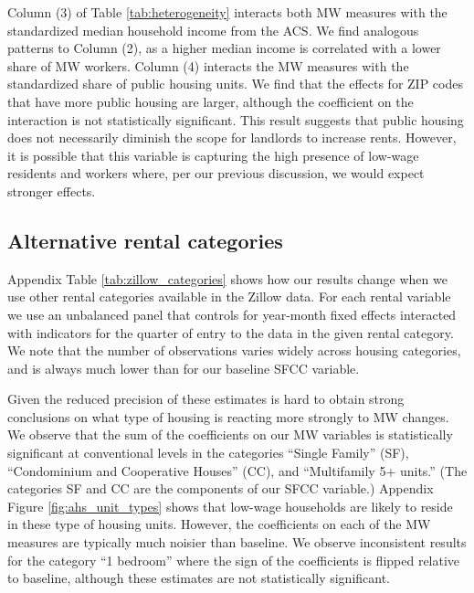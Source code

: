 Column (3) of Table \ref{tab:heterogeneity} interacts both MW measures with the
standardized median household income from the ACS.
We find analogous patterns to Column (2), as a higher median income is 
correlated with a lower share of MW workers.
Column (4) interacts the MW measures with the standardized share of public 
housing units.
We find that the effects for ZIP codes that have more public housing are larger,
although the coefficient on the interaction is not statistically significant. 
This result suggests that public housing does not necessarily diminish the scope 
for landlords to increase rents.
However, it is possible that this variable is capturing the high presence of 
low-wage residents and workers where, per our previous discussion, we would 
expect stronger effects.

\subsection{Alternative rental categories}

Appendix Table \ref{tab:zillow_categories} shows how our results change when we 
use other rental categories available in the Zillow data.
For each rental variable we use an unbalanced panel that controls for
year-month fixed effects interacted with indicators for the quarter of entry
to the data in the given rental category.
We note that the number of observations varies widely across housing categories, 
and is always much lower than for our baseline SFCC variable.

Given the reduced precision of these estimates is hard to obtain strong 
conclusions on what type of housing is reacting more strongly to MW changes.
We observe that the sum of the coefficients on our MW variables is 
statistically significant at conventional levels in the categories 
``Single Family'' (SF),  ``Condominium and Cooperative Houses'' (CC), and 
``Multifamily 5+ units.''
(The categories SF and CC are the components of our SFCC variable.)
Appendix Figure \ref{fig:ahs_unit_types} shows that low-wage households are 
likely to reside in these type of housing units.
However, the coefficients on each of the MW measures are typically much noisier 
than baseline.
We observe inconsistent results for the category ``1 bedroom'' where the sign 
of the coefficients is flipped relative to baseline, although these estimates 
are not statistically significant.


